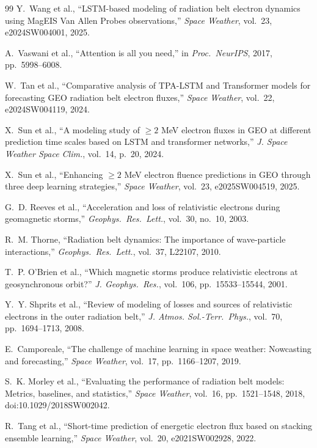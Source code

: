 \documentclass{ieeeaccess}
\begin{document}
\begin{thebibliography}{99}
Y.~Wang et al., ``LSTM-based modeling of radiation belt electron dynamics
using MagEIS Van Allen Probes observations,'' \emph{Space Weather}, vol.~23,
e2024SW004001, 2025.

A.~Vaswani et al., ``Attention is all you need,'' in \emph{Proc.\ NeurIPS},
2017, pp.~5998--6008.

W.~Tan et al., ``Comparative analysis of TPA-LSTM and Transformer models
for forecasting GEO radiation belt electron fluxes,'' \emph{Space Weather},
vol.~22, e2024SW004119, 2024.

X.~Sun et al., ``A modeling study of \(\ge2\) MeV electron fluxes in GEO
at different prediction time scales based on LSTM and transformer networks,''
\emph{J. Space Weather Space Clim.}, vol.~14, p.~20, 2024.

X.~Sun et al., ``Enhancing \(\ge2\) MeV electron fluence predictions in GEO
through three deep learning strategies,'' \emph{Space Weather}, vol.~23,
e2025SW004519, 2025.

G.~D. Reeves et al., ``Acceleration and loss of relativistic electrons
during geomagnetic storms,'' \emph{Geophys.\ Res.\ Lett.}, vol.~30,
no.~10, 2003.

R.~M. Thorne, ``Radiation belt dynamics: The importance of wave-particle
interactions,'' \emph{Geophys.\ Res.\ Lett.}, vol.~37, L22107, 2010.

T.~P. O'Brien et al., ``Which magnetic storms produce relativistic
electrons at geosynchronous orbit?'' \emph{J. Geophys.\ Res.},
vol.~106, pp.~15533--15544, 2001.

Y.~Y. Shprits et al., ``Review of modeling of losses and sources of
relativistic electrons in the outer radiation belt,'' \emph{J. Atmos.
Sol.-Terr.\ Phys.}, vol.~70, pp.~1694--1713, 2008.

E.~Camporeale, ``The challenge of machine learning in space weather:
Nowcasting and forecasting,'' \emph{Space Weather}, vol.~17, pp.~1166--1207,
2019.

S.~K. Morley et al., ``Evaluating the performance of radiation belt models:
Metrics, baselines, and statistics,'' \emph{Space Weather}, vol.~16,
pp.~1521--1548, 2018, doi:10.1029/2018SW002042.

R.~Tang et al., ``Short-time prediction of energetic electron flux based
on stacking ensemble learning,'' \emph{Space Weather}, vol.~20,
e2021SW002928, 2022.


\end{thebibliography}
\end{document}
